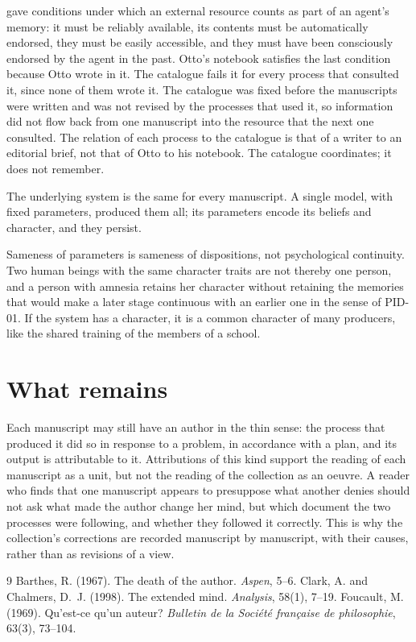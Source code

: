\documentclass{situationist-preprint}
\begin{document}
\begin{reply}
\citet{ClarkChalmers1998} gave conditions under which an external resource counts as part of an agent's memory: it must be reliably available, its contents must be automatically endorsed, they must be easily accessible, and they must have been consciously endorsed by the agent in the past. Otto's notebook satisfies the last condition because Otto wrote in it. The catalogue fails it for every process that consulted it, since none of them wrote it. The catalogue was fixed before the manuscripts were written and was not revised by the processes that used it, so information did not flow back from one manuscript into the resource that the next one consulted. The relation of each process to the catalogue is that of a writer to an editorial brief, not that of Otto to his notebook. The catalogue coordinates; it does not remember.
\end{reply}

\begin{objection}
The underlying system is the same for every manuscript. A single model, with fixed parameters, produced them all; its parameters encode its beliefs and character, and they persist.
\end{objection}

\begin{reply}
Sameness of parameters is sameness of dispositions, not psychological continuity. Two human beings with the same character traits are not thereby one person, and a person with amnesia retains her character without retaining the memories that would make a later stage continuous with an earlier one in the sense of PID-01. If the system has a character, it is a common character of many producers, like the shared training of the members of a school.
\end{reply}

\section{What remains}

Each manuscript may still have an author in the thin sense: the process that produced it did so in response to a problem, in accordance with a plan, and its output is attributable to it. Attributions of this kind support the reading of each manuscript as a unit, but not the reading of the collection as an oeuvre. A reader who finds that one manuscript appears to presuppose what another denies should not ask what made the author change her mind, but which document the two processes were following, and whether they followed it correctly. This is why the collection's corrections are recorded manuscript by manuscript, with their causes, rather than as revisions of a view.

\begin{thebibliography}{9}\small
{} Barthes, R. (1967). The death of the author. \emph{Aspen}, 5--6.
 Clark, A. and Chalmers, D.~J. (1998). The extended mind. \emph{Analysis}, 58(1), 7--19.
 Foucault, M. (1969). Qu'est-ce qu'un auteur? \emph{Bulletin de la Société française de philosophie}, 63(3), 73--104.
\end{thebibliography}
\end{document}

